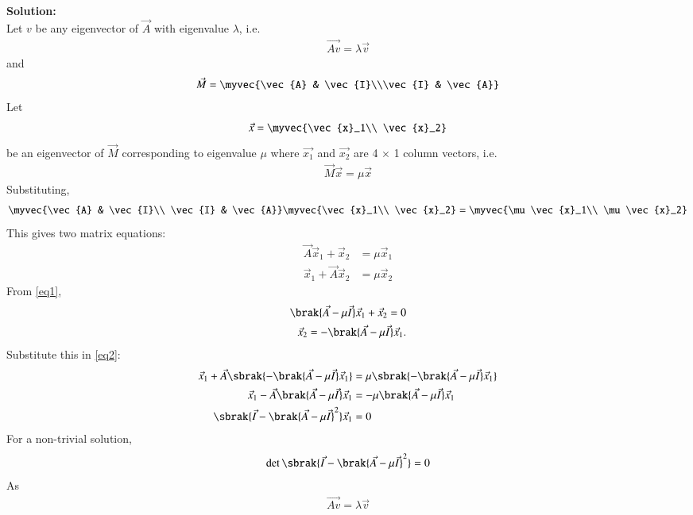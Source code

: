 \documentclass[journal]{IEEEtran}
\begin{document}
\textbf{Solution:}\\
Let $v$ be any eigenvector of $\vec{A}$ with eigenvalue $\lambda$, i.e.
\begin{align}
    \vec{Av}=\lambda \vec{v}
\end{align}
and
\begin{align}
    \vec{M} = \myvec{\vec{A} & \vec{I}\\\vec{I} & \vec{A}}
\end{align}
Let 
\begin{align}
    \vec{x} = \myvec{\vec{x}_1\\ \vec{x}_2}
\end{align}
be an eigenvector of $\vec{M}$ corresponding to eigenvalue $\mu$ where $\vec{x_1}$ and $\vec{x_2}$ are 4 $\times$ 1 column vectors, i.e.
\begin{align}
    \vec{M}\vec{x} = \mu \vec{x}
\end{align}
Substituting,
\begin{align}
    \myvec{\vec{A} & \vec{I}\\ \vec{I} & \vec{A}}
    \myvec{\vec{x}_1\\ \vec{x}_2} = \myvec{\mu \vec{x}_1\\ \mu \vec{x}_2}
\end{align}
This gives two matrix equations:
\begin{align}
\vec{A}\vec{x}_1 + \vec{x}_2 &= \mu \vec{x}_1 \label{eq1}\\
\vec{x}_1 + \vec{A}\vec{x}_2 &= \mu \vec{x}_2 \label{eq2}
\end{align}
From \eqref{eq1},
\begin{align}
    \brak{\vec{A} - \mu \vec{I}}\vec{x}_1 + \vec{x}_2 = 0\\
\vec{x}_2 = -\brak{\vec{A} - \mu \vec{I}}\vec{x}_1.
\end{align}
Substitute this in \eqref{eq2}:
\begin{align}
\vec{x}_1 + \vec{A}\sbrak{-\brak{\vec{A} - \mu \vec{I}}\vec{x}_1} 
&= \mu \sbrak{-\brak{\vec{A} - \mu \vec{I}}\vec{x}_1}\\
\vec{x}_1 - \vec{A}\brak{\vec{A} - \mu \vec{I}}\vec{x}_1 
&= -\mu\brak{\vec{A} - \mu \vec{I}}\vec{x}_1\\
\sbrak{\vec{I} - \brak{\vec{A} - \mu \vec{I}}^2}\vec{x}_1 &= 0
\end{align}
For a non-trivial solution, 
\begin{align}
    \det\sbrak{\vec{I} - \brak{\vec{A} - \mu \vec{I}}^2} = 0
\end{align}
As
\begin{align}
    \vec{Av}=\lambda \vec{v}
\end{align}
\end{document}
